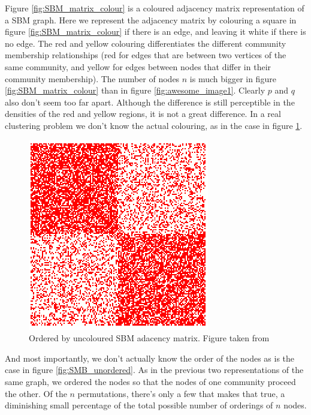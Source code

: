 Figure \ref{fig:SBM_matrix_colour} is a coloured adjacency matrix representation of a SBM graph. Here we represent the adjacency matrix by colouring a square in figure \ref{fig:SBM_matrix_colour} if there is an edge, and leaving it white if there is no edge.  The red and yellow colouring differentiates the different community membership relationships (red for edges that are between two vertices of the same community, and yellow for edges between nodes that differ in their community membership). The number of nodes $n$ is much bigger in figure \ref{fig:SBM_matrix_colour} than in figure \ref{fig:awesome_image1}. Clearly $p$ and $q$ also don't seem too far apart.  Although the difference is still perceptible in the densities of the red and yellow regions, it is not a great difference.  In a real clustering problem we don't know the actual colouring, as in the case in figure \ref{fig:SMB_uncolored}.

\begin{figure}[h]
\begin{center}
  \includegraphics[scale=0.5]{SMB_uncolored}
  \caption{Ordered by uncoloured SBM adacency matrix.  Figure taken from \cite{SBM_adjacency_talk}}
  \label{fig:SMB_uncolored}
 \end{center}
\end{figure}

And most importantly, we don't actually know the order of the nodes as is the case in figure \ref{fig:SMB_unordered}. As in the previous two representations of the same graph, we ordered the nodes so that the nodes of one community proceed the other.  Of the $n\!$ permutations, there's only a few that makes that true, a diminishing small percentage of the total possible number of orderings of $n$ nodes.  

